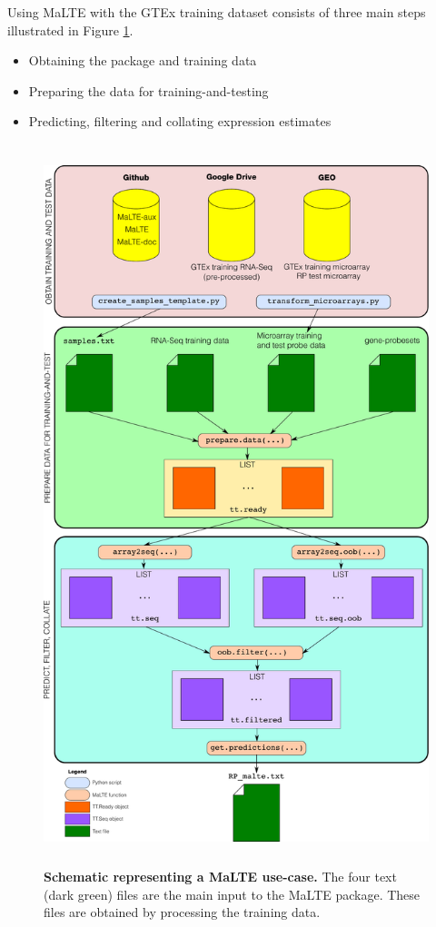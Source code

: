 \documentclass[a4paper,12pt]{article}
\begin{document}
Using MaLTE with the GTEx training dataset consists of three main steps illustrated in Figure \ref{fig:usecase}.

\begin{itemize}
\item Obtaining the package and training data
\item Preparing the data for training-and-testing
\item Predicting, filtering and collating expression estimates
\end{itemize}

\begin{figure}
\centering
\includegraphics[height=21cm]{schematic1.pdf}
\caption{\textbf{Schematic representing a \textsf{MaLTE} use-case.} The four text (dark green) files are the main input to the \textsf{MaLTE} package. These files are obtained by processing the training data.}
\label{fig:usecase}
\end{figure}
\end{document}
